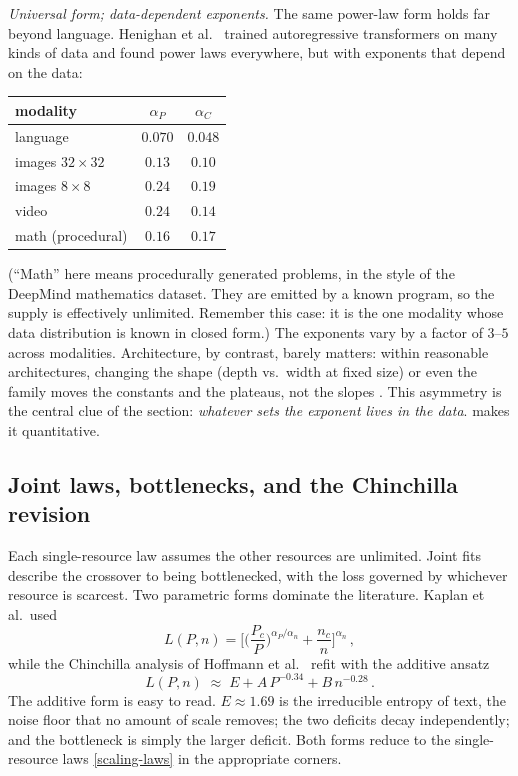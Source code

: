 \documentclass[11pt]{article}
\begin{document}
\emph{Universal form; data-dependent exponents.} The same power-law form holds far beyond language. Henighan et al.\ \cite{henighan2020scaling} trained autoregressive transformers on many kinds of data and found power laws everywhere, but with exponents that depend on the data:
%
\begin{center}
\small
\begin{tabular}{l|cc}
    modality & $\alpha_P$ & $\alpha_C$ \\\hline
    language & $0.070$ & $0.048$ \\
    images $32{\times}32$ & $0.13$ & $0.10$ \\
    images $8{\times}8$ & $0.24$ & $0.19$ \\
    video & $0.24$ & $0.14$ \\
    math (procedural) & $0.16$ & $0.17$
\end{tabular}
\end{center}
%
(``Math'' here means procedurally generated problems, in the style of the DeepMind mathematics dataset. They are emitted by a known program, so the supply is effectively unlimited. Remember this case: it is the one modality whose data distribution is known in closed form.) The exponents vary by a factor of $3$--$5$ across modalities. Architecture, by contrast, barely matters: within reasonable architectures, changing the shape (depth vs.\ width at fixed size) or even the family moves the constants and the plateaus, not the slopes \cite{kaplan2020scaling}. This asymmetry is the central clue of the section: \emph{whatever sets the exponent lives in the data}.  makes it quantitative.

\subsection{Joint laws, bottlenecks, and the Chinchilla revision}
\label{sec:scaling-joint}

Each single-resource law assumes the other resources are unlimited. Joint fits describe the crossover to being bottlenecked, with the loss governed by whichever resource is scarcest. Two parametric forms dominate the literature. Kaplan et al.\ used
%
\begin{equation} \label{kaplan-joint}
    L(P,n) = \Big[\Big(\frac{P_c}{P}\Big)^{\alpha_P/\alpha_n} + \frac{n_c}{n}\Big]^{\alpha_n}\,,
\end{equation}
%
while the Chinchilla analysis of Hoffmann et al.\ \cite{hoffmann2022training} refit with the additive ansatz
%
\begin{equation} \label{chinchilla}
    L(P,n) \;\approx\; E + A\, P^{-0.34} + B\, n^{-0.28}\,.
\end{equation}
%
The additive form is easy to read. $E\approx 1.69$ is the irreducible entropy of text, the noise floor that no amount of scale removes; the two deficits decay independently; and the bottleneck is simply the larger deficit. Both forms reduce to the single-resource laws \eqref{scaling-laws} in the appropriate corners.
\end{document}
